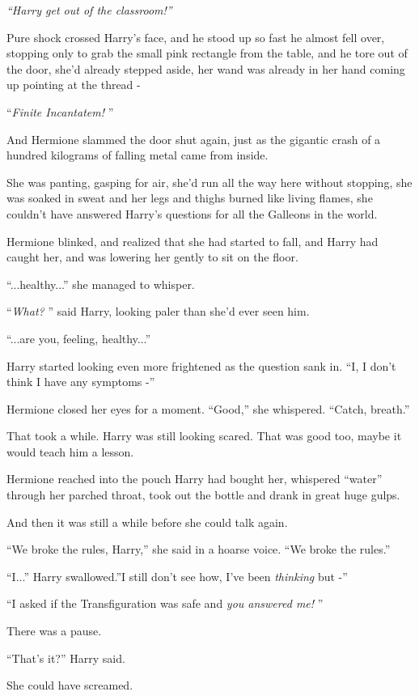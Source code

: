 \emph{``Harry get out of the classroom!''}

Pure shock crossed Harry's face, and he stood up so fast he almost fell
over, stopping only to grab the small pink rectangle from the table, and
he tore out of the door, she'd already stepped aside, her wand was
already in her hand coming up pointing at the thread -

``\emph{Finite Incantatem!} ''

And Hermione slammed the door shut again, just as the gigantic crash of
a hundred kilograms of falling metal came from inside.

She was panting, gasping for air, she'd run all the way here without
stopping, she was soaked in sweat and her legs and thighs burned like
living flames, she couldn't have answered Harry's questions for all the
Galleons in the world.

Hermione blinked, and realized that she had started to fall, and Harry
had caught her, and was lowering her gently to sit on the floor.

``...healthy...'' she managed to whisper.

``\emph{What?} '' said Harry, looking paler than she'd ever seen him.

``...are you, feeling, healthy...''

Harry started looking even more frightened as the question sank in. ``I,
I don't think I have any symptoms -''

Hermione closed her eyes for a moment. ``Good,'' she whispered. ``Catch,
breath.''

That took a while. Harry was still looking scared. That was good too,
maybe it would teach him a lesson.

Hermione reached into the pouch Harry had bought her, whispered
``water'' through her parched throat, took out the bottle and drank in
great huge gulps.

And then it was still a while before she could talk again.

``We broke the rules, Harry,'' she said in a hoarse voice. ``We broke
the rules.''

``I...'' Harry swallowed.''I still don't see how, I've been
\emph{thinking} but -''

``I asked if the Transfiguration was safe and \emph{you answered me!} ''

There was a pause.

``That's it?'' Harry said.

She could have screamed.


